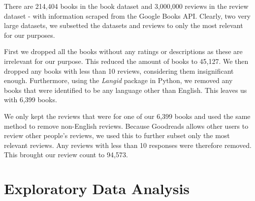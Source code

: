 \documentclass[12pt]{article}
\numberwithin{equation}{section}
\begin{document}
There are 214,404 books in the book dataset and 3,000,000 reviews in the review dataset - with information scraped from the Google Books API. Clearly, two very large datasets, we subsetted the datasets and reviews to only the most relevant for our purposes.

First we dropped all the books without any ratings or descriptions as these are irrelevant for our purpose. This reduced the amount of books to 45,127. We then dropped any books with less than 10 reviews, considering them insignificant enough. Furthermore, using the \textit{Langid} package in Python, we removed any books that were identified to be any language other than English. This leaves us with 6,399 books.

We only kept the reviews that were for one of our 6,399 books and used the same method to remove non-English reviews. Because Goodreads allows other users to review other people's reviews, we used this to further subset only the most relevant reviews. Any reviews with less than 10 responses were therefore removed. This brought our review count to 94,573.

\section{Exploratory Data Analysis}
\end{document}
